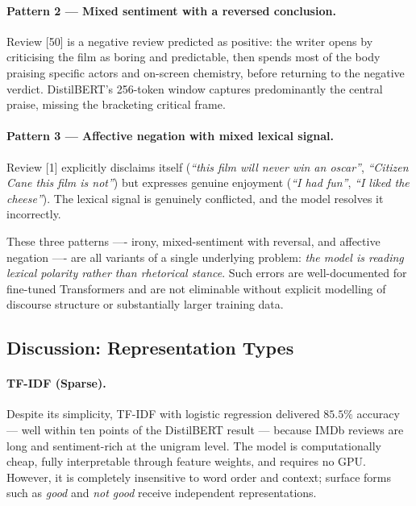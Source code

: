 \paragraph{Pattern 2 — Mixed sentiment with a reversed conclusion.}
Review [50] is a negative review predicted as positive: the writer opens
by criticising the film as boring and predictable, then spends most of
the body praising specific actors and on-screen chemistry, before
returning to the negative verdict. DistilBERT's 256-token window captures
predominantly the central praise, missing the bracketing critical frame.

\paragraph{Pattern 3 — Affective negation with mixed lexical signal.}
Review [1] explicitly disclaims itself (\textit{``this film will never
win an oscar''}, \textit{``Citizen Cane this film is not''}) but
expresses genuine enjoyment (\textit{``I had fun''}, \textit{``I liked
the cheese''}). The lexical signal is genuinely conflicted, and the
model resolves it incorrectly.

These three patterns —- irony, mixed-sentiment with reversal, and
affective negation —- are all variants of a single underlying problem:
\emph{the model is reading lexical polarity rather than rhetorical
stance}. Such errors are well-documented for fine-tuned Transformers and
are not eliminable without explicit modelling of discourse structure or
substantially larger training data.

\subsection{Discussion: Representation Types}

\paragraph{TF-IDF (Sparse).} Despite its simplicity, TF-IDF with logistic
regression delivered $85.5\%$ accuracy --- well within ten points of
the DistilBERT result --- because IMDb reviews are long and
sentiment-rich at the unigram level. The model is computationally cheap,
fully interpretable through feature weights, and requires no GPU.
However, it is completely insensitive to word order and context; surface
forms such as \textit{good} and \textit{not good} receive independent
representations.

